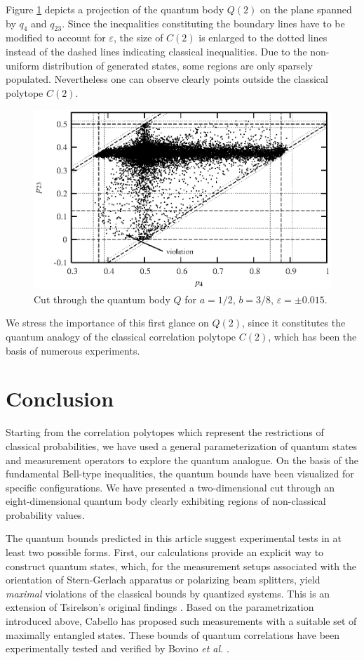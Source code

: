 Figure \ref{f-2003-bell2hull}
depicts a projection of the quantum body $Q(2)$ on
the plane spanned by $q_{4}$ and $q_{23}$. Since the
inequalities constituting the boundary lines have to be modified to
account for $\varepsilon$, the size of $C(2)$ is enlarged
to the dotted lines instead of the dashed lines indicating classical
inequalities. Due to the non-uniform distribution of generated
states, some regions are only sparsely populated.
Nevertheless one can
observe clearly points outside the classical polytope $C(2)$.
\begin{figure}[htbp]
  \centering
  \includegraphics{2003-qpoly-bell2}
  \caption{Cut through the quantum body $Q$ for $a=1/2$, $b=3/8$, $\varepsilon=\pm 0.015$.}
  \label{f-2003-bell2hull}
\end{figure}
We stress the importance of this first glance on $Q(2)$,
since it constitutes the quantum analogy
of the classical correlation polytope $C(2)$,
which has been the
basis of numerous experiments.


\section{Conclusion}

Starting from the correlation polytopes
which represent the restrictions of classical probabilities,
we have used a general parameterization of quantum states and
measurement operators to explore the quantum analogue.
On the basis of the fundamental Bell-type inequalities, the quantum
bounds have been visualized for specific configurations.
We have
presented a
two-dimensional cut through an eight-dimensional quantum body
clearly
exhibiting regions of non-classical probability values.


The quantum bounds predicted in this article
suggest experimental tests in at least two possible forms.
First, our calculations provide an explicit way to construct quantum states, which,
for the measurement setups associated with the orientation of Stern-Gerlach apparatus
or polarizing beam splitters,
yield {\em maximal} violations of the classical bounds by quantized systems.
This is an extension of Tsirelson's original findings \cite{cirelson:80,cirelson}.
Based on the parametrization introduced above, Cabello has proposed such measurements
\cite{cabello-2003a} with a suitable set of maximally entangled states.
These bounds of quantum correlations
have been experimentally tested and verified by Bovino {\it et al.}
\cite{bovino-2003}.

